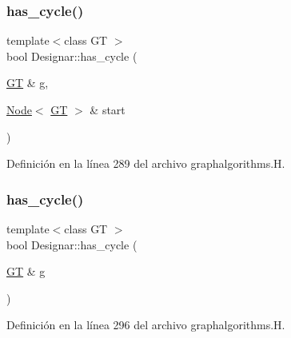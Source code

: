 \subsubsection{\texorpdfstring{has\+\_\+cycle()}{has\_cycle()}\hspace{0.1cm}{\footnotesize\ttfamily [1/2]}}
{\footnotesize\ttfamily template$<$class GT $>$ \\
bool Designar\+::has\+\_\+cycle (\begin{DoxyParamCaption}\item[{\hyperlink{demo-buildgraph_8_c_a3001c40d2c31ca87ed96cd7d1334a55e}{GT} \&}]{g,  }\item[{\hyperlink{namespace_designar_a5af326c65aa2bd26b26c410f2030d09e}{Node}$<$ \hyperlink{demo-buildgraph_8_c_a3001c40d2c31ca87ed96cd7d1334a55e}{GT} $>$ \&}]{start }\end{DoxyParamCaption})}



Definición en la línea 289 del archivo graphalgorithms.\+H.

\mbox{\label{namespace_designar_a4b250ae7cdab37b1a1489179266ef5d6}} 
\subsubsection{\texorpdfstring{has\+\_\+cycle()}{has\_cycle()}\hspace{0.1cm}{\footnotesize\ttfamily [2/2]}}
{\footnotesize\ttfamily template$<$class GT $>$ \\
bool Designar\+::has\+\_\+cycle (\begin{DoxyParamCaption}\item[{\hyperlink{demo-buildgraph_8_c_a3001c40d2c31ca87ed96cd7d1334a55e}{GT} \&}]{g }\end{DoxyParamCaption})}



Definición en la línea 296 del archivo graphalgorithms.\+H.

\mbox{\label{namespace_designar_a696580cb9bbe71161e0e3ffa27c95157}} 
